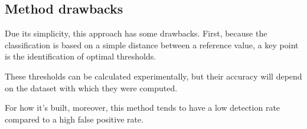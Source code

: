\subsection{Method drawbacks}

Due its simplicity, this approach has some drawbacks. First, because the classification is based on a simple distance between a reference value, a key point is the identification of optimal thresholds.

These thresholds can be calculated experimentally, but their accuracy will depend on the dataset with which they were computed.

For how it's built, moreover, this method tends to have a low detection rate compared to a high false positive rate.